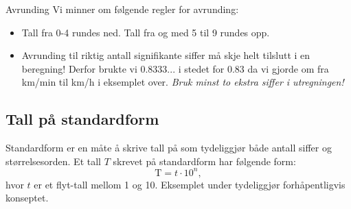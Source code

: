 
\begin{mymerk*}{Avrunding}
Vi minner om følgende regler for avrunding:
\begin{itemize}
    \item Tall fra 0-4 rundes ned. Tall fra og med 5 til 9 rundes opp.
    \item Avrunding til riktig antall signifikante siffer må skje helt tilslutt i en beregning! Derfor brukte vi 0.8333... i stedet for 0.83 da vi gjorde om fra km/min til km/h i eksemplet over. \textit{Bruk minst to ekstra siffer i utregningen!}
\end{itemize}
\end{mymerk*}


\subsection{Tall på standardform}
Standardform er en måte å skrive tall på som tydeliggjør både antall siffer og størrelsesorden. Et tall $T$ skrevet på standardform har følgende form:
\[
\label{eq:standardform}
\textrm{T}=t \cdot 10^n,
\]
hvor $t$ er et flyt-tall mellom 1 og 10. Eksemplet under tydeliggjør forhåpentligvis konseptet.

